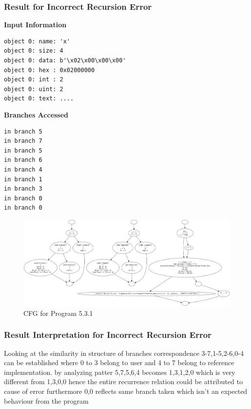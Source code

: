 \subsubsection{Result for Incorrect Recursion Error}
\textbf{Input Information}
\begin{verbatim}
object 0: name: 'x'
object 0: size: 4
object 0: data: b'\x02\x00\x00\x00'
object 0: hex : 0x02000000
object 0: int : 2
object 0: uint: 2
object 0: text: .... 
\end{verbatim}
\textbf{Branches Accessed}
\begin{verbatim}
in branch 5
in branch 7
in branch 5
in branch 6
in branch 4
in branch 1
in branch 3
in branch 0
in branch 0
\end{verbatim}
\begin{figure}[h]
\centering
\includegraphics[width=1\textwidth]{5/5.3.1.c.png}
\caption{CFG for Program 5.3.1}
\label{fig:cfg5.3.1}
\end{figure}
\subsubsection{Result Interpretation for Incorrect Recursion Error}
Looking at the similarity in structure of branches correspondence 3-7,1-5,2-6,0-4 can be established  where 0 to 3 belong to user and 4 to 7 belong to reference implementation.
by analyzing patter 5,7,5,6,4 becomes 1,3,1,2,0 which is very different from 1,3,0,0 hence the entire recurrence relation could be attributed to cause of error furthermore 0,0 reflects same branch taken which isn't an expected behaviour from the program




